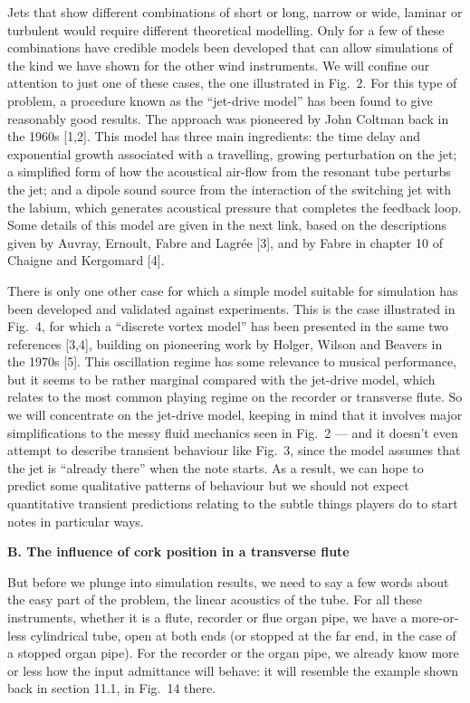   Jets that show different combinations of short or long, narrow or wide, 
  laminar or turbulent would require different theoretical modelling. Only for 
  a few of these combinations have credible models been developed that can 
  allow simulations of the kind we have shown for the other wind instruments. 
  We will confine our attention to just one of these cases, the one illustrated 
  in Fig.\ 2. For this type of problem, a procedure known as the “jet-drive 
  model” has been found to give reasonably good results. The approach was 
  pioneered by John Coltman back in the 1960s [1,2]. This model has three main 
  ingredients: the time delay and exponential growth associated with a 
  travelling, growing perturbation on the jet; a simplified form of how the 
  acoustical air-flow from the resonant tube perturbs the jet; and a dipole 
  sound source from the interaction of the switching jet with the labium, which 
  generates acoustical pressure that completes the feedback loop. Some details 
  of this model are given in the next link, based on the descriptions given by 
  Auvray, Ernoult, Fabre and Lagrée [3], and by Fabre in chapter 10 of Chaigne 
  and Kergomard [4]. 

  There is only one other case for which a simple model suitable for simulation 
  has been developed and validated against experiments. This is the case 
  illustrated in Fig.\ 4, for which a “discrete vortex model” has been 
  presented in the same two references [3,4], building on pioneering work by 
  Holger, Wilson and Beavers in the 1970s [5]. This oscillation regime has some 
  relevance to musical performance, but it seems to be rather marginal compared 
  with the jet-drive model, which relates to the most common playing regime on 
  the recorder or transverse flute. So we will concentrate on the jet-drive 
  model, keeping in mind that it involves major simplifications to the messy 
  fluid mechanics seen in Fig.\ 2 — and it doesn’t even attempt to describe 
  transient behaviour like Fig.\ 3, since the model assumes that the jet is 
  ``already there'' when the note starts. As a result, we can hope to predict 
  some qualitative patterns of behaviour but we should not expect quantitative 
  transient predictions relating to the subtle things players do to start notes 
  in particular ways. 

  \textbf{B. The influence of cork position in a transverse flute} 

  But before we plunge into simulation results, we need to say a few words 
  about the easy part of the problem, the linear acoustics of the tube. For all 
  these instruments, whether it is a flute, recorder or flue organ pipe, we 
  have a more-or-less cylindrical tube, open at both ends (or stopped at the 
  far end, in the case of a stopped organ pipe). For the recorder or the organ 
  pipe, we already know more or less how the input admittance will behave: it 
  will resemble the example shown back in section 11.1, in Fig.\ 14 there. 


